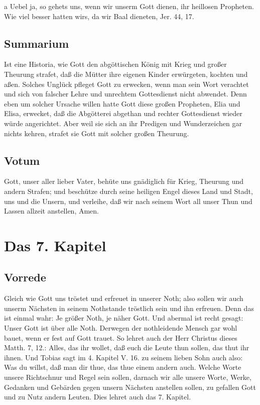 a Uebel ja, so gehets uns, wenn wir unserm Gott dienen, ihr heillosen Propheten. Wie viel besser hatten wirs, da wir Baal dieneten, Jer. 44, 17.

\section{Summarium}

Ist eine Historia, wie Gott den abgöttischen König mit Krieg und großer Theurung strafet, daß die Mütter ihre eigenen Kinder erwürgeten, kochten und aßen. Solches Unglück pfleget Gott zu erwecken, wenn man sein Wort verachtet und sich von falscher Lehre und unrechtem Gottesdienst nicht abwendet. Denn eben um solcher Ursache willen hatte Gott diese großen Propheten, Elia und Elisa, erwecket, daß die Abgötterei abgethan und rechter Gottesdienst wieder würde angerichtet. Aber weil sie sich an ihr Predigen und Wunderzeichen gar nichts kehren, strafet sie Gott mit solcher großen Theurung.

\section{Votum}

Gott, unser aller lieber Vater, behüte uns gnädiglich für Krieg, Theurung und andern Strafen; und beschütze durch seine heiligen Engel dieses Land und Stadt, uns und die Unsern, und verleihe, daß wir nach seinem Wort all unser Thun und Lassen allzeit anstellen, Amen.

\chapter{Das 7. Kapitel}

\section{Vorrede}

Gleich wie Gott uns tröstet und erfreuet in unserer Noth; also sollen wir auch unserm Nächsten in seinem Nothstande tröstlich sein und ihn erfreuen. Denn das ist einmal wahr: Je größer Noth, je näher Gott. Und abermal ist recht gesagt: Unser Gott ist über alle Noth. Derwegen der nothleidende Mensch gar wohl bauet, wenn er fest auf Gott trauet. So lehret auch der Herr Christus dieses Matth. 7, 12.: Alles, das ihr wollet, daß euch die Leute thun sollen, das thut ihr ihnen. Und Tobias sagt im 4. Kapitel V. 16. zu seinem lieben Sohn auch also: Was du willst, daß man dir thue, das thue einem andern auch. Welche Worte unsere Richtschnur und Regel sein sollen, darnach wir alle unsere Worte, Werke, Gedanken und Gebärden gegen unsern Nächsten anstellen sollen, zu gefallen Gott und zu Nutz andern Leuten. Dies lehret auch das 7. Kapitel.


